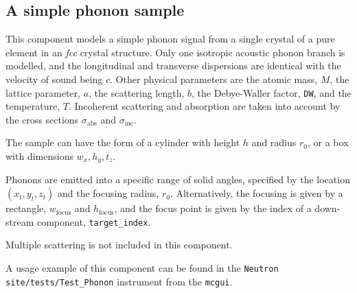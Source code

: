 \subsection*{A simple phonon sample}
\label{s:phonon_simple}


This component models a simple phonon signal from a single crystal of
a pure element in an {\em fcc} crystal structure.
Only one isotropic acoustic phonon branch is modelled, and the longitudinal
and transverse dispersions are identical with the velocity of sound being $c$.
Other physical parameters are the atomic mass, $M$, the lattice parameter, $a$,
the scattering length, $b$,
the Debye-Waller factor, \verb+DW+, and the temperature, $T$.
Incoherent scattering and absorption are taken into account by the cross
sections $\sigma_\textrm{abs}$ and $\sigma_\textrm{inc}$.

The sample can have the form of a cylinder with height $h$ and radius
$r_0$, or a box with dimensions $w_x, h_y, t_z$.

Phonons are emitted into a specific range of solid angles, specified
by the location $(x_t, y_t, z_t)$ and the focusing radius, $r_0$.
Alternatively, the focusing is given by a rectangle,
$w_\textrm{focus}$ and $h_\textrm{focus}$, and the focus point is given by the
index of a down-stream component, \verb+target_index+.

Multiple scattering is not included in this component.

A usage example of this component can be found in the \verb+Neutron site/tests/Test_Phonon+ instrument from the \verb+mcgui+.

